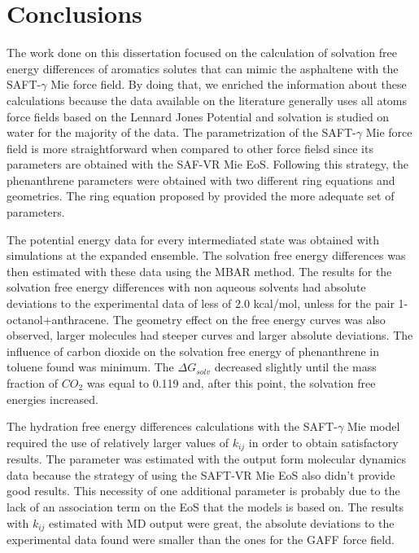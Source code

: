 \chapter{Conclusions} %

\label{Chapter6} %
The work done on this dissertation focused on the calculation of solvation free energy differences of aromatics solutes that can mimic the asphaltene with the SAFT-$\gamma$ Mie force field. By doing that, we enriched the information about these calculations because the data available on the literature generally uses all atoms force fields based on the Lennard Jones Potential and solvation is studied on water for the majority of the data. The parametrization of the SAFT-$\gamma$ Mie force field is more straightforward when compared to other force fielsd since its parameters are obtained with the SAF-VR Mie EoS. Following this strategy, the phenanthrene parameters were obtained with two different ring equations and geometries. The ring equation proposed by  provided the more adequate set of parameters. 

The potential energy data for every intermediated state was obtained with simulations at the expanded ensemble. The solvation free energy differences was then estimated with these data using the MBAR method. The results for the solvation free energy differences  with non aqueous solvents had absolute deviations to the experimental data of less of 2.0 kcal/mol, unless for the pair 1-octanol+anthracene. The geometry effect on the free energy curves was also observed, larger molecules had steeper curves and larger absolute deviations. The influence of carbon dioxide on the solvation free energy of phenanthrene in toluene found was minimum. The $\Delta G_{solv}$ decreased slightly until the mass fraction of $CO_{2}$ was equal to 0.119 and, after this point, the solvation free energies increased.   

The hydration free energy differences calculations with the SAFT-$\gamma$ Mie model required the use of relatively larger values of $k_{ij}$ in order to obtain satisfactory results. The parameter was estimated with the output form molecular dynamics data because the  strategy of using the SAFT-VR Mie EoS also didn't provide good results. This necessity of one additional parameter is probably due to the lack of an association term on the EoS that the models is based on. The results with $k_{ij}$ estimated with MD output were great, the absolute deviations to the experimental data found were smaller than the ones for the GAFF force field.   

